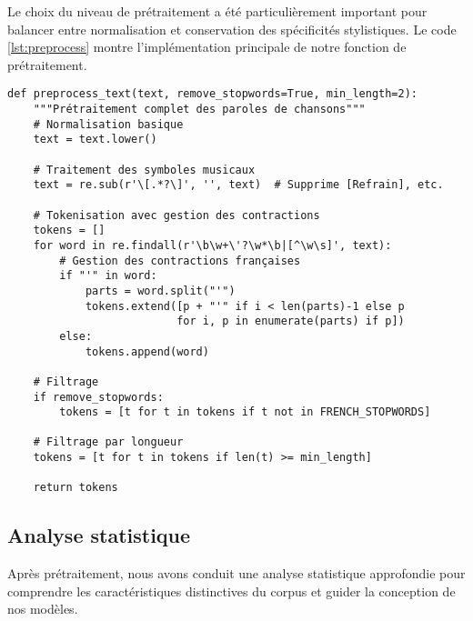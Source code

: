 \documentclass[a4paper,11pt]{article}
\begin{document}
Le choix du niveau de prétraitement a été particulièrement important pour balancer entre normalisation et conservation des spécificités stylistiques. Le code \ref{lst:preprocess} montre l'implémentation principale de notre fonction de prétraitement.

\begin{lstlisting}[caption={Implémentation de la fonction de prétraitement}, label=lst:preprocess]
def preprocess_text(text, remove_stopwords=True, min_length=2):
    """Prétraitement complet des paroles de chansons"""
    # Normalisation basique
    text = text.lower()
    
    # Traitement des symboles musicaux
    text = re.sub(r'\[.*?\]', '', text)  # Supprime [Refrain], etc.
    
    # Tokenisation avec gestion des contractions
    tokens = []
    for word in re.findall(r'\b\w+\'?\w*\b|[^\w\s]', text):
        # Gestion des contractions françaises
        if "'" in word:
            parts = word.split("'")
            tokens.extend([p + "'" if i < len(parts)-1 else p 
                          for i, p in enumerate(parts) if p])
        else:
            tokens.append(word)
    
    # Filtrage
    if remove_stopwords:
        tokens = [t for t in tokens if t not in FRENCH_STOPWORDS]
    
    # Filtrage par longueur
    tokens = [t for t in tokens if len(t) >= min_length]
    
    return tokens
\end{lstlisting}

\subsection{Analyse statistique}
Après prétraitement, nous avons conduit une analyse statistique approfondie pour comprendre les caractéristiques distinctives du corpus et guider la conception de nos modèles.
\end{document}
